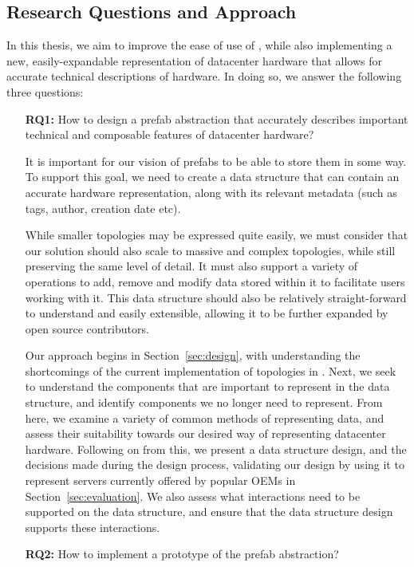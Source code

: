 \documentclass[11pt]{article}
\begin{document}
	\subsection{Research Questions and Approach}
		In this thesis, we aim to improve the ease of use of \opendc{}, while also implementing a new, easily-expandable representation of datacenter hardware that allows for accurate technical descriptions of hardware. 
		In doing so, we answer the following three questions:
		\begin{itemize}
			\item [\textbf{RQ1:}] How to design a prefab abstraction that accurately describes important technical and composable features of datacenter hardware?

			It is important for our vision of prefabs to be able to store them in some way.
			To support this goal, we need to create a data structure that can contain an accurate hardware representation, along with its relevant metadata (such as tags, author, creation date etc).

			While smaller topologies may be expressed quite easily, we must consider that our solution should also scale to massive and complex topologies, while still preserving the same level of detail.
			It must also support a variety of operations to add, remove and modify data stored within it to facilitate users working with it.
			This data structure should also be relatively straight-forward to understand and easily extensible, allowing it to be further expanded by open source contributors.

			Our approach begins in Section~\ref{sec:design}, with understanding the shortcomings of the current implementation of topologies in \opendc{}.
			Next, we seek to understand the components that are important to represent in the data structure, and identify components we no longer need to represent.
			From here, we examine a variety of common methods of representing data, and assess their suitability towards our desired way of representing datacenter hardware.
			Following on from this, we present a data structure design, and the decisions made during the design process, validating our design by using it to represent servers currently offered by popular OEMs in Section~\ref{sec:evaluation}.
			We also assess what interactions need to be supported on the data structure, and ensure that the data structure design supports these interactions.

			\item [\textbf{RQ2:}] How to implement a prototype of the prefab abstraction?


\end{itemize}
\end{document}

